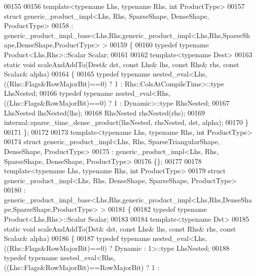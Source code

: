 \begin{DoxyCode}
00155 
00156 \textcolor{keyword}{template}<\textcolor{keyword}{typename} Lhs, \textcolor{keyword}{typename} Rhs, \textcolor{keywordtype}{int} ProductType>
00157 \textcolor{keyword}{struct }generic\_product\_impl<Lhs, Rhs, SparseShape, DenseShape, ProductType>
00158  : generic\_product\_impl\_base<Lhs,Rhs,generic\_product\_impl<Lhs,Rhs,SparseShape,DenseShape,ProductType> >
00159 \{
00160   \textcolor{keyword}{typedef} \textcolor{keyword}{typename} Product<Lhs,Rhs>::Scalar Scalar;
00161   
00162   \textcolor{keyword}{template}<\textcolor{keyword}{typename} Dest>
00163   \textcolor{keyword}{static} \textcolor{keywordtype}{void} scaleAndAddTo(Dest& dst, \textcolor{keyword}{const} Lhs& lhs, \textcolor{keyword}{const} Rhs& rhs, \textcolor{keyword}{const} Scalar& alpha)
00164   \{
00165     \textcolor{keyword}{typedef} \textcolor{keyword}{typename} nested\_eval<Lhs,((Rhs::Flags&RowMajorBit)==0) ? 1 : Rhs::ColsAtCompileTime>::type 
      LhsNested;
00166     \textcolor{keyword}{typedef} \textcolor{keyword}{typename} nested\_eval<Rhs,((Lhs::Flags&RowMajorBit)==0) ? 1 : Dynamic>::type RhsNested;
00167     LhsNested lhsNested(lhs);
00168     RhsNested rhsNested(rhs);
00169     internal::sparse\_time\_dense\_product(lhsNested, rhsNested, dst, alpha);
00170   \}
00171 \};
00172 
00173 \textcolor{keyword}{template}<\textcolor{keyword}{typename} Lhs, \textcolor{keyword}{typename} Rhs, \textcolor{keywordtype}{int} ProductType>
00174 \textcolor{keyword}{struct }generic\_product\_impl<Lhs, Rhs, SparseTriangularShape, DenseShape, ProductType>
00175   : generic\_product\_impl<Lhs, Rhs, SparseShape, DenseShape, ProductType>
00176 \{\};
00177 
00178 \textcolor{keyword}{template}<\textcolor{keyword}{typename} Lhs, \textcolor{keyword}{typename} Rhs, \textcolor{keywordtype}{int} ProductType>
00179 \textcolor{keyword}{struct }generic\_product\_impl<Lhs, Rhs, DenseShape, SparseShape, ProductType>
00180   : generic\_product\_impl\_base<Lhs,Rhs,generic\_product\_impl<Lhs,Rhs,DenseShape,SparseShape,ProductType> >
00181 \{
00182   \textcolor{keyword}{typedef} \textcolor{keyword}{typename} Product<Lhs,Rhs>::Scalar Scalar;
00183   
00184   \textcolor{keyword}{template}<\textcolor{keyword}{typename} Dst>
00185   \textcolor{keyword}{static} \textcolor{keywordtype}{void} scaleAndAddTo(Dst& dst, \textcolor{keyword}{const} Lhs& lhs, \textcolor{keyword}{const} Rhs& rhs, \textcolor{keyword}{const} Scalar& alpha)
00186   \{
00187     \textcolor{keyword}{typedef} \textcolor{keyword}{typename} nested\_eval<Lhs,((Rhs::Flags&RowMajorBit)==0) ? Dynamic : 1>::type LhsNested;
00188     \textcolor{keyword}{typedef} \textcolor{keyword}{typename} nested\_eval<Rhs,((Lhs::Flags&RowMajorBit)==RowMajorBit) ? 1 :

\end{DoxyCode}
